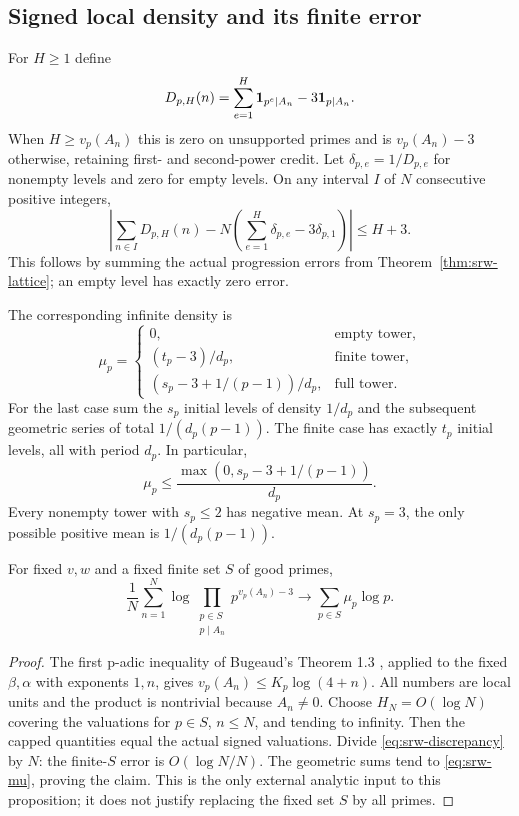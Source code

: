 \subsection{Signed local density and its finite error}
For $H\ge1$ define
\[
 D_{p,H}(n)=\sum_{e=1}^H{\bf1}_{p^e\mid A_n}
             -3{\bf1}_{p\mid A_n}.
\]
When $H\ge v_p(A_n)$ this is zero on unsupported primes and is
$v_p(A_n)-3$ otherwise, retaining first- and second-power credit. Let
$\delta_{p,e}=1/D_{p,e}$ for nonempty levels and zero for empty levels.
On any interval $I$ of $N$ consecutive positive integers,
\begin{equation}\label{eq:srw-discrepancy}
 \left|\sum_{n\in I}D_{p,H}(n)
 -N\left(\sum_{e=1}^H\delta_{p,e}-3\delta_{p,1}\right)\right|
 \le H+3.
\end{equation}
This follows by summing the actual progression errors from
Theorem~\ref{thm:srw-lattice}; an empty level has exactly zero error.

The corresponding infinite density is
\begin{equation}\label{eq:srw-mu}
 \mu_p=
 \begin{cases}
 0,&\text{empty tower},\\
 (t_p-3)/d_p,&\text{finite tower},\\
 (s_p-3+1/(p-1))/d_p,&\text{full tower}.
 \end{cases}
\end{equation}
For the last case sum the $s_p$ initial levels of density $1/d_p$ and the
subsequent geometric series of total $1/(d_p(p-1))$. The finite case has
exactly $t_p$ initial levels, all with period $d_p$. In particular,
\[
 \mu_p\le\frac{\max(0,s_p-3+1/(p-1))}{d_p}.
\]
Every nonempty tower with $s_p\le2$ has negative mean. At $s_p=3$, the only
possible positive mean is $1/(d_p(p-1))$.

\begin{proposition}\label{prop:srw-cesaro}
For fixed $v,w$ and a fixed finite set $S$ of good primes,
\[
 \frac1N\sum_{n=1}^N
 \log\prod_{\substack{p\in S\\p\mid A_n}}p^{v_p(A_n)-3}
 \longrightarrow\sum_{p\in S}\mu_p\log p.
\]
\end{proposition}
\begin{proof}
The first p-adic inequality of Bugeaud's Theorem 1.3
\cite{EPBugeaud2022}, applied to the fixed $\beta,\alpha$ with exponents
$1,n$, gives $v_p(A_n)\le K_p\log(4+n)$. All numbers are local units and
the product is nontrivial because $A_n\ne0$. Choose $H_N=O(\log N)$
covering the valuations for $p\in S$, $n\le N$, and tending to infinity.
Then the capped quantities equal the actual signed valuations. Divide
\eqref{eq:srw-discrepancy} by $N$: the finite-$S$ error is
$O(\log N/N)$. The geometric sums tend to \eqref{eq:srw-mu}, proving the
claim. This is the only external analytic input to this proposition; it does
not justify replacing the fixed set $S$ by all primes.
\end{proof}


